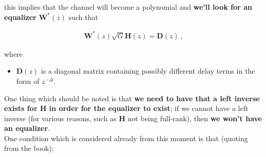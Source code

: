 \documentclass[a4paper, 12pt]{book}
\begin{document}
this implies that the channel will become a polynomial and \textbf{we'll look for an equalizer} $\mathbf{W}^*(z)$ such that

\begin{align}
    \mathbf{W}^*(z)\sqrt{G}\mathbf{H}(z) = \mathbf{D}(z) \,, \tag{2.130}
\end{align}

where

\begin{itemize}
    \item $\mathbf{D}(z)$ is a diagonal matrix containing possibly different delay terms in the form of $z^{-\Delta}$.
\end{itemize}

\begin{center}
\end{center}

One thing which should be noted is that \textbf{we need to have that a left inverse exists for $\mathbf{H}$ in order for the equalizer to exist}; if we cannot have a left inverse (for various reasons, such as $\mathbf{H}$ not being full-rank), then \textbf{we won't have an equalizer}.\\
One condition which is considered already from this moment is that (quoting from the book):
\end{document}
